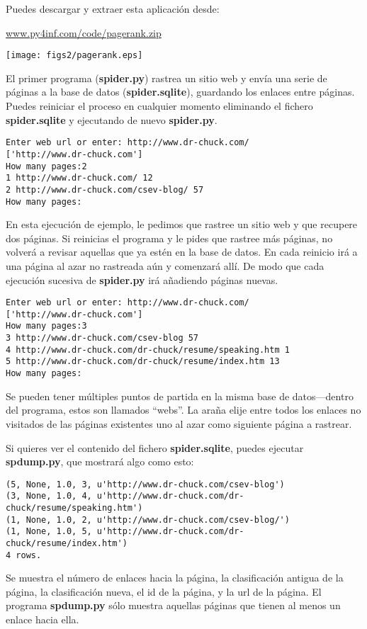 Puedes descargar y extraer esta aplicación desde:

\url{www.py4inf.com/code/pagerank.zip}

\beforefig
\centerline{\texttt{[image: figs2/pagerank.eps]}}
\afterfig

El primer programa ({\bf spider.py}) rastrea un sitio web
y envía una serie de páginas a la
base de datos ({\bf spider.sqlite}), guardando los enlaces entre páginas.
Puedes reiniciar el proceso en cualquier momento eliminando el
fichero {\bf spider.sqlite} y ejecutando de nuevo {\bf spider.py}.

\beforeverb
\begin{verbatim}
Enter web url or enter: http://www.dr-chuck.com/
['http://www.dr-chuck.com']
How many pages:2
1 http://www.dr-chuck.com/ 12
2 http://www.dr-chuck.com/csev-blog/ 57
How many pages:
\end{verbatim}
\afterverb
%
En esta ejecución de ejemplo, le pedimos que rastree un sitio web y que recupere dos
páginas. Si reinicias el programa y le pides que rastree más
páginas, no volverá a revisar aquellas que ya estén en la base de datos.
En cada reinicio irá a una página al azar no rastreada aún y comenzará allí.
De modo que cada ejecución sucesiva de {\bf spider.py} irá añadiendo páginas nuevas.

\beforeverb
\begin{verbatim}
Enter web url or enter: http://www.dr-chuck.com/
['http://www.dr-chuck.com']
How many pages:3
3 http://www.dr-chuck.com/csev-blog 57
4 http://www.dr-chuck.com/dr-chuck/resume/speaking.htm 1
5 http://www.dr-chuck.com/dr-chuck/resume/index.htm 13
How many pages:
\end{verbatim}
\afterverb
%
Se pueden tener múltiples puntos de partida en la misma base de datos---dentro
del programa, estos son llamados ``webs''. La araña
elije entre todos los enlaces no visitados de las páginas existentes uno al azar
como siguiente página a rastrear.

Si quieres ver el contenido del fichero {\bf spider.sqlite}, puedes
ejecutar {\bf spdump.py}, que mostrará algo como esto:

\beforeverb
\begin{verbatim}
(5, None, 1.0, 3, u'http://www.dr-chuck.com/csev-blog')
(3, None, 1.0, 4, u'http://www.dr-chuck.com/dr-chuck/resume/speaking.htm')
(1, None, 1.0, 2, u'http://www.dr-chuck.com/csev-blog/')
(1, None, 1.0, 5, u'http://www.dr-chuck.com/dr-chuck/resume/index.htm')
4 rows.
\end{verbatim}
\afterverb
%
Se muestra el número de enlaces hacia la página, la clasificación antigua de la página, la
clasificación nueva, el id de la página, y la url de la página. El programa {\bf spdump.py}
sólo muestra aquellas páginas que tienen al menos un enlace hacia ella.

